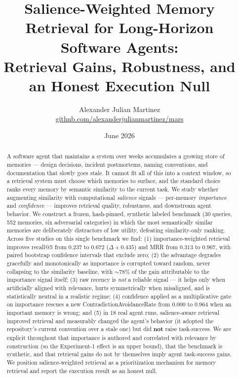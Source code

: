 \documentclass[11pt]{article}
\title{\textbf{Salience-Weighted Memory Retrieval for Long-Horizon
Software Agents:\\ Retrieval Gains, Robustness, and an Honest Execution Null}}
\author{Alexander Julian Martinez\\
\small \href{https://github.com/alexanderjulianmartinez/mars}{github.com/alexanderjulianmartinez/mars}}
\date{June 2026}
\begin{document}
\maketitle

\begin{abstract}
A software agent that maintains a system over weeks accumulates a growing store of
memories --- design decisions, incident postmortems, naming conventions, and
documentation that slowly goes stale. It cannot fit all of this into a context window,
so a retrieval system must choose which memories to surface, and the standard choice
ranks every memory by semantic similarity to the current task. We study whether
augmenting similarity with computational \emph{salience} signals --- per-memory
\emph{importance} and \emph{confidence} --- improves retrieval quality, robustness, and
downstream agent behavior. We construct a frozen, hash-pinned, synthetic labeled
benchmark (30 queries, 552 memories, six adversarial categories) in which the most
semantically similar memories are deliberately distractors of low utility, defeating
similarity-only ranking. Across five studies on this single benchmark we find: (1)
importance-weighted retrieval improves recall@5 from $0.237$ to $0.672$ ($\Delta +0.435$)
and MRR from $0.313$ to $0.967$, with paired bootstrap confidence intervals that exclude
zero; (2) the advantage degrades gracefully and monotonically as importance is corrupted
toward random, never collapsing to the similarity baseline, with $\sim$78\% of the gain
attributable to the importance signal itself; (3) raw recency is \emph{not} a reliable
signal --- it helps only when artificially aligned with relevance, hurts symmetrically
when misaligned, and is statistically neutral in a realistic regime; (4) confidence
applied as a multiplicative gate on importance rescues a new ContradictionAvoidanceRate
from $0.000$ to $0.964$ when an important memory is wrong; and (5) in 18 real agent runs,
salience-aware retrieval improved retrieval and measurably changed the agent's behavior
(it adopted the repository's current convention over a stale one) but did \textbf{not}
raise task-success. We are explicit throughout that importance is authored and correlated
with relevance by construction (so the Experiment-1 effect is an upper bound), that the
benchmark is synthetic, and that retrieval gains do not by themselves imply agent
task-success gains. We position salience-weighted retrieval as a prioritization mechanism
for memory retrieval and report the execution result as an honest null.
\end{abstract}
\end{document}
